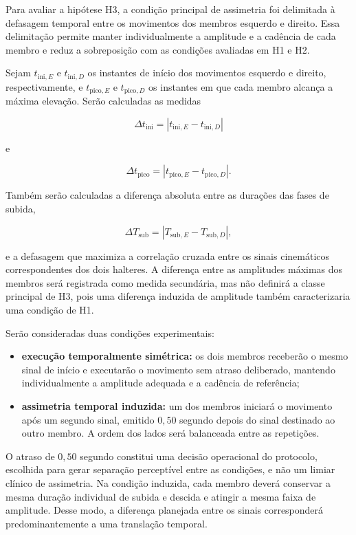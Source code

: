 Para avaliar a hipótese H3, a condição principal de assimetria foi
delimitada à defasagem temporal entre os movimentos dos membros esquerdo
e direito. Essa delimitação permite manter individualmente a amplitude e
a cadência de cada membro e reduz a sobreposição com as condições
avaliadas em H1 e H2.

Sejam $t_{\mathrm{ini},E}$ e $t_{\mathrm{ini},D}$ os instantes de início
dos movimentos esquerdo e direito, respectivamente, e
$t_{\mathrm{pico},E}$ e $t_{\mathrm{pico},D}$ os instantes em que cada
membro alcança a máxima elevação. Serão calculadas as medidas

\[
\Delta t_{\mathrm{ini}} =
\left|t_{\mathrm{ini},E}-t_{\mathrm{ini},D}\right|
\]

e

\[
\Delta t_{\mathrm{pico}} =
\left|t_{\mathrm{pico},E}-t_{\mathrm{pico},D}\right|.
\]

Também serão calculadas a diferença absoluta entre as durações das fases
de subida,

\[
\Delta T_{\mathrm{sub}} =
\left|T_{\mathrm{sub},E}-T_{\mathrm{sub},D}\right|,
\]

e a defasagem que maximiza a correlação cruzada entre os sinais
cinemáticos correspondentes dos dois halteres. A diferença entre as
amplitudes máximas dos membros será registrada como medida secundária,
mas não definirá a classe principal de H3, pois uma diferença induzida de
amplitude também caracterizaria uma condição de H1.

Serão consideradas duas condições experimentais:

\begin{itemize}
    \item \textbf{execução temporalmente simétrica:} os dois membros
    receberão o mesmo sinal de início e executarão o movimento sem atraso
    deliberado, mantendo individualmente a amplitude adequada e a cadência
    de referência;

    \item \textbf{assimetria temporal induzida:} um dos membros iniciará
    o movimento após um segundo sinal, emitido $0{,}50$ segundo depois do
    sinal destinado ao outro membro. A ordem dos lados será balanceada
    entre as repetições.
\end{itemize}

O atraso de $0{,}50$ segundo constitui uma decisão operacional do
protocolo, escolhida para gerar separação perceptível entre as condições,
e não um limiar clínico de assimetria. Na condição induzida, cada membro
deverá conservar a mesma duração individual de subida e descida e atingir
a mesma faixa de amplitude. Desse modo, a diferença planejada entre os
sinais corresponderá predominantemente a uma translação temporal.

